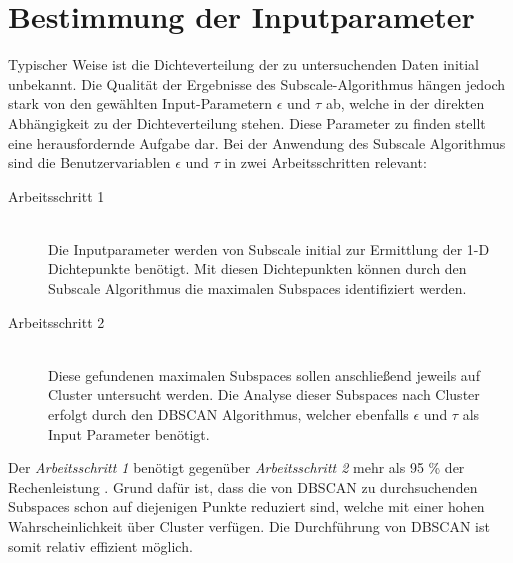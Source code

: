 \documentclass[utf8,biblatex]{lni}
\begin{document}
\section{Bestimmung der Inputparameter}
Typischer Weise ist die Dichteverteilung der zu untersuchenden Daten
initial unbekannt.
Die Qualität der Ergebnisse des Subscale-Algorithmus hängen jedoch
stark von den gewählten Input-Parametern $\epsilon$ und $\tau$ ab,
welche in der direkten Abhängigkeit zu der Dichteverteilung stehen.
Diese Parameter zu finden stellt eine herausfordernde Aufgabe dar.
Bei der Anwendung des Subscale Algorithmus sind die Benutzervariablen $\epsilon$ und $\tau$ in zwei Arbeitsschritten relevant:
\begin{description}
\item[Arbeitsschritt 1]\hfill \\
Die Inputparameter werden von Subscale initial zur Ermittlung der 1-D Dichtepunkte benötigt.
Mit diesen Dichtepunkten können durch den Subscale Algorithmus die maximalen Subspaces identifiziert werden.
\item[Arbeitsschritt 2]\hfill \\
  Diese gefundenen maximalen Subspaces sollen anschließend jeweils auf Cluster untersucht werden.
  Die Analyse dieser Subspaces nach Cluster erfolgt durch den DBSCAN Algorithmus, welcher ebenfalls $\epsilon$ und $\tau$
  als Input Parameter benötigt.
\end{description}
Der \emph{Arbeitsschritt 1} benötigt gegenüber \emph{Arbeitsschritt 2} mehr als 95 \% der Rechenleistung \Cite{JournalArticel}.
Grund dafür ist, dass die von DBSCAN zu durchsuchenden Subspaces schon auf diejenigen Punkte reduziert sind,
welche mit einer hohen Wahrscheinlichkeit über Cluster verfügen.
Die Durchführung von DBSCAN ist somit relativ effizient möglich.





\printbibliography
\end{document}
